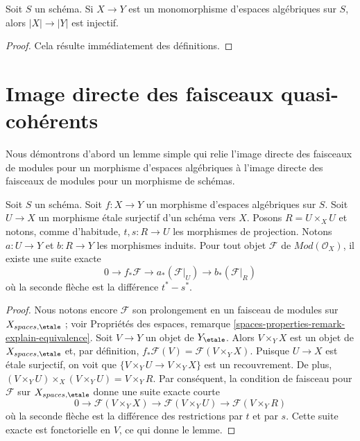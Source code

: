 \begin{lemma}
\label{lemma-monomorphism-injective-points}
Soit $S$ un schéma. Si $X \to Y$ est un monomorphisme d'espaces algébriques
sur $S$, alors $|X| \to |Y|$ est injectif.
\end{lemma}

\begin{proof}
Cela résulte immédiatement des définitions.
\end{proof}















\section{Image directe des faisceaux quasi-cohérents}
\label{section-pushforward}

\noindent
Nous démontrons d'abord un lemme simple qui relie l'image directe des faisceaux de modules
pour un morphisme d'espaces algébriques à l'image directe des faisceaux de modules pour
un morphisme de schémas.

\begin{lemma}
\label{lemma-compute-pushforward}
Soit $S$ un schéma.
Soit $f : X \to Y$ un morphisme d'espaces algébriques sur $S$.
Soit $U \to X$ un morphisme \'etale surjectif d'un schéma vers $X$.
Posons $R = U \times_X U$ et notons, comme d'habitude, $t, s : R \to U$ les morphismes
de projection. Notons $a : U \to Y$ et $b : R \to Y$ les morphismes
induits. Pour tout objet $\mathcal{F}$ de $\textit{Mod}(\mathcal{O}_X)$,
il existe une suite exacte
$$
0 \to f_*\mathcal{F} \to a_*(\mathcal{F}|_U) \to b_*(\mathcal{F}|_R)
$$
où la seconde flèche est la différence $t^* - s^*$.
\end{lemma}

\begin{proof}
Nous notons encore $\mathcal{F}$ son prolongement en un faisceau de modules sur
$X_{spaces, \etale}$ ; voir
Propriétés des espaces,
remarque \ref{spaces-properties-remark-explain-equivalence}.
Soit $V \to Y$ un objet de $Y_\etale$. Alors $V \times_Y X$ est un
objet de $X_{spaces, \etale}$ et, par définition,
$f_*\mathcal{F}(V) = \mathcal{F}(V \times_Y X)$. Puisque $U \to X$ est
\'etale surjectif, on voit que $\{V \times_Y U \to V \times_Y X\}$
est un recouvrement. De plus,
$(V \times_Y U) \times_X (V \times_Y U) = V \times_Y R$.
Par conséquent, la condition de faisceau pour $\mathcal{F}$ sur
$X_{spaces, \etale}$ donne une suite exacte courte
$$
0 \to \mathcal{F}(V \times_Y X)
\to \mathcal{F}(V \times_Y U) \to \mathcal{F}(V \times_Y R)
$$
où la seconde flèche est la différence des restrictions par $t$ et par $s$.
Cette suite exacte est fonctorielle en $V$, ce qui donne le lemme.
\end{proof}

